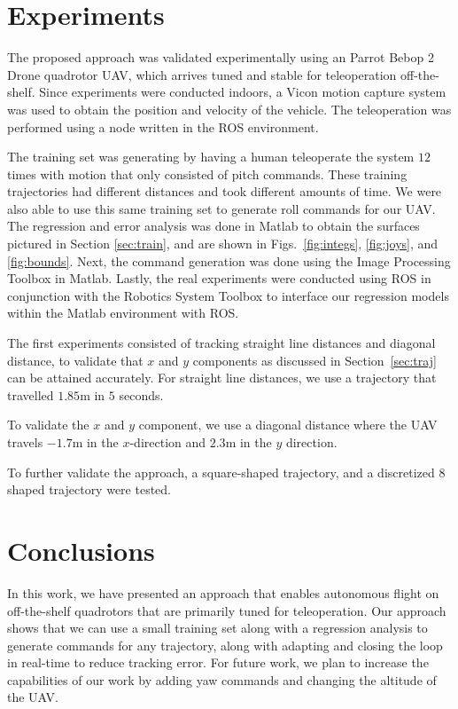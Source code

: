 \documentclass[letterpaper, 10 pt, conference]{ieeeconf}  %
\begin{document}
\section{Experiments} \label{sec:exper}

The proposed approach was validated experimentally using an Parrot Bebop 2 Drone quadrotor UAV, which arrives tuned and stable for teleoperation off-the-shelf. Since experiments were conducted indoors, a Vicon motion capture system was used to obtain the position and velocity of the vehicle. The teleoperation was performed using a node written in the ROS environment.

The training set was generating by having a human teleoperate the system $12$ times with motion that only consisted of pitch commands. These training trajectories had different distances and took different amounts of time. We were also able to use this same training set to generate roll commands for our UAV. The regression and error analysis was done in Matlab to obtain the surfaces pictured in Section \ref{sec:train}, and are shown in Figs.~\ref{fig:integs}, \ref{fig:joys}, and \ref{fig:bounds}. Next, the command generation was done using the Image Processing Toolbox in Matlab. Lastly, the real experiments were conducted using ROS in conjunction with the Robotics System Toolbox to interface our regression models within the Matlab environment with ROS.

The first experiments consisted of tracking straight line distances and diagonal distance, to validate that $x$ and $y$ components as discussed in Section~\ref{sec:traj} can be attained accurately. For straight line distances, we use a trajectory that travelled $1.85$m in $5$ seconds.

To validate the $x$ and $y$ component, we use a diagonal distance where the UAV travels $-1.7$m in the $x$-direction and $2.3$m in the $y$ direction.

To further validate the approach, a square-shaped trajectory, and a discretized $8$ shaped trajectory were tested. 




\section{Conclusions} \label{sec:conc}
In this work, we have presented an approach that enables autonomous flight on off-the-shelf quadrotors that are primarily tuned for teleoperation. Our approach shows that we can use a small training set along with a regression analysis to generate commands for any trajectory, along with adapting and closing the loop in real-time to reduce tracking error. For future work, we plan to increase the capabilities of our work by adding yaw commands and changing the altitude of the UAV.
\end{document}
